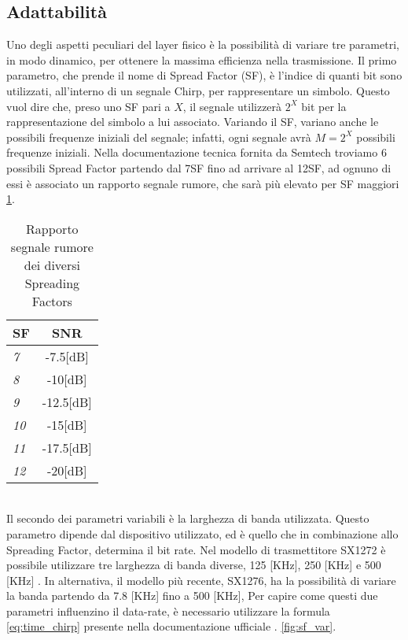 \subsection{Adattabilità}
Uno degli aspetti peculiari del layer fisico è la possibilità di 
variare tre parametri, in modo dinamico, per ottenere la massima efficienza
nella trasmissione.
Il primo parametro, che prende il nome di Spread Factor (SF),
è l'indice di quanti bit sono utilizzati, all'interno di un segnale Chirp,
per rappresentare  un simbolo. Questo vuol dire che, preso uno 
SF pari a $X$, il segnale  utilizzerà $2^X$ bit per la rappresentazione del simbolo a lui
associato. Variando il SF, variano anche le possibili frequenze iniziali del
segnale; infatti, ogni segnale avrà $M=2^X$ possibili frequenze iniziali.
Nella documentazione tecnica fornita da Semtech \cite{Basic_lora} troviamo 6 possibili Spread
Factor partendo dal 7SF fino ad arrivare al 12SF, ad ognuno di essi è associato un
rapporto segnale rumore, che sarà più elevato per SF maggiori \ref{tab:SNR}. 
\begin{table}[ht]
        \centering
        \begin{tabular}{l|c}
                \textbf{SF}  & SNR \\
                \hline
                \emph{7}  & -7.5[dB] \\
                \emph{8}  & -10[dB]  \\
                \emph{9}   & -12.5[dB]  \\
                \emph{10} & -15[dB] \\
                \emph{11} & -17.5[dB] \\
                \emph{12} & -20[dB] \\
        \end{tabular}
        \caption{Rapporto segnale rumore dei diversi Spreading Factors}
        \label{tab:SNR}
\end{table}
\\
Il secondo dei parametri variabili è la larghezza di banda utilizzata. Questo
parametro dipende dal dispositivo utilizzato, ed è quello che in  combinazione allo Spreading Factor, 
determina il bit rate.
Nel modello di trasmettitore SX1272 è possibile utilizzare tre larghezza
di banda diverse, 125 [KHz],
250 [KHz] e 500 [KHz] . In alternativa, il modello più recente, SX1276, ha la possibilità di variare
la banda partendo da 7.8 [KHz] fino a 500 [KHz],
Per capire come questi due parametri influenzino il data-rate, 
è necessario utilizzare la formula \ref{eq:time_chirp} presente nella
documentazione ufficiale \cite{Basic_lora}.
\ref{fig:sf_var}.

